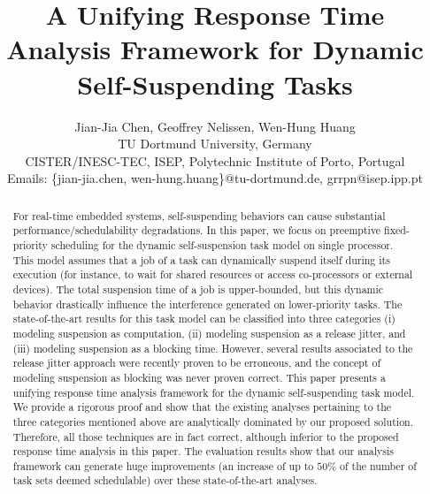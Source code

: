 \documentclass[conference]{IEEEtran}
\begin{document}
  
\title{A Unifying Response Time Analysis Framework for Dynamic Self-Suspending Tasks}

\author{Jian-Jia Chen, Geoffrey Nelissen, Wen-Hung Huang\\
 TU Dortmund University, Germany\\
 CISTER/INESC-TEC, ISEP, Polytechnic Institute of Porto, Portugal \\
Emails: \{jian-jia.chen, wen-hung.huang\}@tu-dortmund.de, grrpn@isep.ipp.pt
}

\maketitle

\begin{abstract}
  For real-time embedded systems, self-suspending behaviors can cause
  substantial performance/schedulability degradations. In this paper,
  we focus on preemptive fixed-priority scheduling for the dynamic
  self-suspension task model on single processor. This
  model assumes that a job of a task can dynamically suspend itself during its execution (for instance, to wait for shared resources or access co-processors or external devices).
  The total suspension time of a job is upper-bounded, but this dynamic behavior drastically influence the interference generated on lower-priority tasks. The state-of-the-art results for this task model can be classified
  into three categories (i) modeling suspension as computation, (ii)
  modeling suspension as a release jitter, and (iii) modeling suspension as a blocking time.
  However, several results associated to the release jitter approach were recently proven to be erroneous, and the concept of modeling suspension as blocking was never
  proven correct. This paper presents a unifying
  response time analysis framework for the dynamic self-suspending
  task model. We provide a rigorous proof and show that the existing analyses pertaining to the three categories mentioned above are analytically dominated by our proposed solution. Therefore, all those techniques are in fact correct, although
  inferior to the proposed response time analysis in this paper. The
  evaluation results show that our analysis framework can generate huge
  improvements (an increase of up to $50\%$ of the number of task sets
  deemed schedulable) over these state-of-the-art analyses.
\end{abstract}
\end{document}

